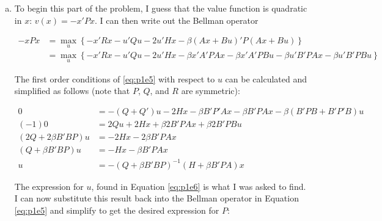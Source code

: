 \begin{homeworkProblem}[Problem 5.1]
{    \begin{enumerate}[a.]
      \item To begin this part of the problem, I guess that the value function is quadratic in $x$: $v(x) = -x'Px$. I can then write out the Bellman operator

        \begin{align} \label{eq:p1e5}
          -x P x &= \max_{u} \left\{-x'Rx - u'Qu - 2u'Hx - \beta (Ax + Bu)' P (Ax + Bu) \right\} \\
          &= \max_{u} \left\{-x'Rx - u'Qu - 2u'Hx - \beta x'A'PAx - \beta x'A'PBu - \beta u'B'PAx - \beta u'B'PBu \right\}
        \end{align}

        The first order conditions of \ref{eq:p1e5} with respect to $u$ can be calculated and simplified as follows (note that $P$, $Q$, and $R$  are symmetric):

        \begin{align} \label{eq:p1e6}
          0 &= - (Q + Q') u - 2 H x - \beta B'P'Ax - \beta B'PAx - \beta (B'PB + B'P'B) u \\
            (-1) 0 &=  2Qu + 2Hx + \beta 2B'PAx + \beta 2B'PBu \\
            (2Q + 2\beta B'BP)u &= -2Hx - 2 \beta B'PAx \\
            (Q + \beta B'BP)u &= -Hx - \beta B'PAx \\
            u &=- (Q + \beta B'BP)^{-1} (H + \beta B'PA)x
        \end{align}

        The expression for $u$, found in Equation \ref{eq:p1e6} is what I was asked to find.  I can now substitute this result back into the Bellman operator in Equation \ref{eq:p1e5} and simplify to get the desired expression for $P$:


\end{enumerate}}
\end{homeworkProblem}
